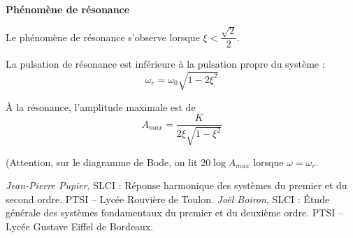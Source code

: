 \documentclass[10pt,oneside]{article}
\begin{document}
\begin{resultat}
\textbf{Phénomène de résonance}

Le phénomène de résonance s'observe lorsque $\xi<\dfrac{\sqrt{2}}{2}$.

La pulsation de résonance est inférieure à la pulsation propre du système :
$$
\omega_r = \omega_0\sqrt{1-2\xi^2}
$$

\`A la résonance, l'amplitude maximale est de 
$$
A_{max} = \dfrac{K}{2\xi\sqrt{1-\xi^2}}
$$

(Attention, sur le diagramme de Bode, on lit $20\log A_{max}$ lorsque $\omega=\omega_r$.
\end{resultat}




\begin{thebibliography}{2}
 \textit{Jean-Pierre Pupier}, SLCI : Réponse harmonique des systèmes du premier et du second ordre. PTSI -- Lycée Rouvière de Toulon.
    \textit{Joël Boiron}, SLCI : Étude générale des systèmes fondamentaux du premier et du deuxième ordre. PTSI -- Lycée Gustave Eiffel de Bordeaux.

\end{thebibliography}
\end{document}
